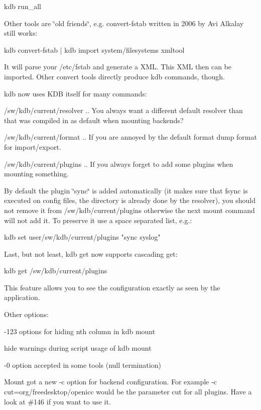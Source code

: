 \begin{DoxyCode}
kdb run\_all
\end{DoxyCode}


Other tools are \char`\"{}old friends\char`\"{}, e.\+g. convert-\/fstab written in 2006 by Avi Alkalay still works\+:


\begin{DoxyCode}
kdb convert-fstab | kdb import system/filesystems xmltool
\end{DoxyCode}


It will parse your /etc/fstab and generate a X\+ML. This X\+ML then can be imported. Other convert tools directly produce kdb commands, though.

kdb now uses K\+DB itself for many commands\+:


\begin{DoxyItemize}
\item /sw/kdb/current/resolver .. You always want a different default resolver than that was compiled in as default when mounting backends?
\item /sw/kdb/current/format .. If you are annoyed by the default format dump format for import/export.
\item /sw/kdb/current/plugins .. If you always forget to add some plugins when mounting something.
\end{DoxyItemize}

By default the plugin \char`\"{}sync\char`\"{} is added automatically (it makes sure that fsync is executed on config files, the directory is already done by the resolver), you should not remove it from /sw/kdb/current/plugins otherwise the next mount command will not add it. To preserve it use a space separated list, e.\+g.\+:


\begin{DoxyCode}
kdb set user/sw/kdb/current/plugins "sync syslog"
\end{DoxyCode}


Last, but not least, kdb get now supports cascading get\+:


\begin{DoxyCode}
kdb get /sw/kdb/current/plugins
\end{DoxyCode}


This feature allows you to see the configuration exactly as seen by the application.

Other options\+:


\begin{DoxyItemize}
\item -\/123 options for hiding nth column in {\ttfamily kdb mount}
\item hide warnings during script usage of {\ttfamily kdb mount}
\item -\/0 option accepted in some tools (null termination)
\item Mount got a new -\/c option for backend configuration. For example -\/c cut=org/freedesktop/openicc would be the parameter cut for all plugins. Have a look at \#146 if you want to use it.
\end{DoxyItemize}

